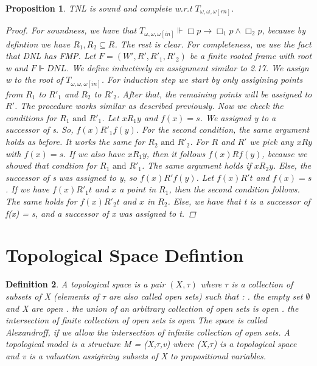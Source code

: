 \documentclass[12pt, a4paper]{scrartcl}
\newtheorem{definition}{Definition}[subsection]
\newtheorem{proposition}[definition]{Proposition}
\begin{document}
\begin{proposition}
    TNL is sound and complete w.r.t $T_{\omega,\omega,\omega[rn]}$.

    \begin{proof}
    For soundness, we have that $T_{\omega,\omega,\omega[in]} \Vdash \Box p \rightarrow \Box_1 p \land \Box_2p$, because by defintion we have $R_1,R_2 \subseteq R$. The rest is clear.
    For completeness, we use the fact that DNL has FMP. Let $F = (W',R', R'_1, R'_2)$ be a finite rooted frame with root w and $F \Vdash DNL$. We define inductively an
    assignment similar to 2.17. We assign w to the root of $T_{\omega,\omega,\omega[in]}$. For induction step we start by only assigining points from $R_1$ to $R'_1$ and $R_2$ to $R'_2$. After that, the remaining points will be assigned to $R'$.
    The procedure works similar as described previously. \newline
    Now we check the conditions for $R_1 \mbox{ and } R'_1$. Let $xR_1y$ and $f(x) = s$. We assigned y to a successor of s. So, $f(x) R'_1f(y)$. For the second condition, the same argument holds as before.
    It works the same for $R_2 \mbox{ and } R'_2$. For $R$ and $R'$ we pick any $xRy$ with $f(x) = s$. 
    If we also have $xR_1y$, then it follows $f(x)Rf(y)$, because we showed that condtion for $R_1 \mbox{ and } R'_1$. The same argument holds if $xR_2y$. Else, the successor of s was assigned to y, so $f(x)R'f(y)$. 
    Let $f(x)R't$ and $f(x) = s$. If we have $f(x) R'_1 t$  and $x$ a point in $R_1$, then the second condition follows. The same holds for $f(x)R'_2t$ and $x$ in $R_2$.
    Else, we have that t is a successor of f(x) = s, and a successor of x was assigned to t.
    \end{proof}
        
\end{proposition}




\clearpage

\section{Topological Space Defintion}

\begin{definition}
    A topological space is a pair $(X, \tau)$ where $\tau$ is a collection of subsets of X (elements of $\tau$ are also called open sets) such that : 
    \newline
    . the empty set $\emptyset $ and X are open
    . the union of an arbitrary collection of open sets is open
    . the intersection of finite collection of open sets is open
    \newline
    \newline
    The space is called Alexandroff, if we allow the intersection of infinite collection of open sets.
    A topological model is a structure M = (X,$\tau$,v) where (X,$\tau$) is a topological space
    and v is a valuation assigining subsets of X to propositional variables. 
        
\end{definition}
\end{document}
